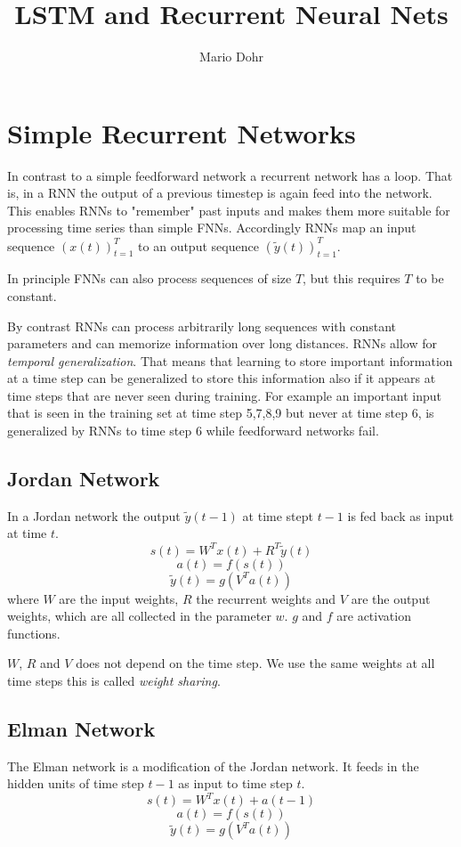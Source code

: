 \documentclass[10pt,a4paper]{article}
\author{Mario Dohr}
\title{LSTM and Recurrent Neural Nets}
\numberwithin{equation}{section}
\begin{document}
\maketitle
\section{Simple Recurrent Networks}
In contrast to a simple feedforward network a recurrent network has a loop. That is, in a RNN the output of a previous timestep is again feed into the network. This enables RNNs to "remember" past inputs and makes them more suitable for processing time series than simple FNNs. 
Accordingly RNNs map an input sequence $(x(t))_{t=1}^T$ to an output sequence $(\tilde{y}(t))_{t=1}^T$.

In principle FNNs can also process sequences of size $T$, but this requires $T$ to be constant. 

By contrast RNNs can process arbitrarily long sequences with constant parameters and can memorize information over long distances. RNNs allow for \textit{temporal generalization}. That means that learning to store important information at a time step can be generalized to store this information also if it appears at  time steps that are never seen during training. For example an important input that is seen in the training set at time step 5,7,8,9 but never at time step 6, is generalized by RNNs to time step 6 while feedforward networks fail.

\subsection{Jordan Network}
In a Jordan network the output $\tilde{y}(t-1)$ at time stept $t-1$ is fed back as input at time $t$.
\[ s(t) = W^T x(t) + R^T \tilde{y}(t) \]
\[ a(t) = f(s(t)) \]
\[ \tilde{y}(t) = g(V^T a(t)) \]
where $W$ are the input weights, $R$ the recurrent weights and $V$ are the output weights, which are all collected in the parameter $w$. 
$g$ and $f$ are activation functions.

$W$, $R$ and $V$ does not depend on the time step. We use the same weights at all time steps this is called
\textit{weight sharing}.

\subsection{Elman Network}
The Elman network is a modification of the Jordan network. It feeds in the hidden units of time step $t-1$ as input to time step $t$. 
\[ s(t) = W^T x(t) + a(t-1) \]
\[ a(t) = f(s(t)) \]
\[ \tilde{y}(t) = g(V^T a(t)) \]
\end{document}
